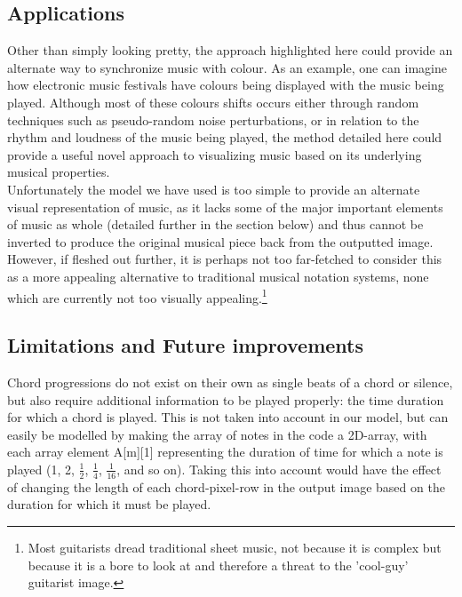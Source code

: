 \documentclass{article}
\begin{document}
\subsection{Applications}

Other than simply looking pretty, the approach highlighted here could provide an alternate way to synchronize music with colour. As an example, one can imagine how electronic music festivals have colours being displayed with the music being played. Although most of these colours shifts occurs either through random techniques such as pseudo-random noise perturbations, or in relation to the rhythm and loudness of the music being played, the method detailed here could provide a useful novel approach to visualizing music based on its underlying musical properties.\\

Unfortunately the model we have used is too simple to provide an alternate visual representation of music, as it lacks some of the major important elements of music as whole (detailed further in the section below) and thus cannot be inverted to produce the original musical piece back from the outputted image. However, if fleshed out further, it is perhaps not too far-fetched to consider this as a more appealing alternative to traditional musical notation systems, none which are currently not too visually appealing.\footnote{Most guitarists dread traditional sheet music, not because it is complex but because it is a bore to look at and therefore a threat to the 'cool-guy' guitarist image.}\\

\subsection{Limitations and Future improvements}

Chord progressions do not exist on their own as single beats of a chord or silence, but also require additional information to be played properly: the time duration for which a chord is played. This is not taken into account in our model, but can easily be modelled by making the array of notes in the code a 2D-array, with each array element A[m][1] representing the duration of time for which a note is played (1, 2, $\frac{1}{2}$, $\frac{1}{4}$, $\frac{1}{16}$, and so on). Taking this into account would have the effect of changing the length of each chord-pixel-row in the output image based on the duration for which it must be played.\\
\end{document}
